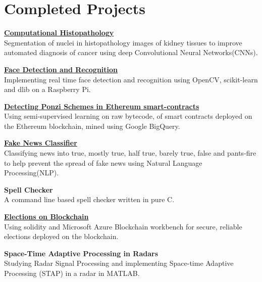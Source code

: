 \documentclass[letterpaper]{article}
\renewenvironment{itemize}{
  \begin{list}{}{
    \setlength{\leftmargin}{1.5em}
  }
}{
  \end{list}
}
\begin{document}
\section*{Completed Projects}
  \begin{itemize}
    \item
    \href{https://github.com/rshwndsz/nuclei-segmentation}{\textbf{Computational Histopathology}}\\
    Segmentation of nuclei in histopathology images of kidney tissues to improve automated diagnosis of cancer using deep Convolutional Neural Networks(CNNs).

    \item
    \href{https://github.com/rshwndsz/face-net}{\textbf{Face Detection and Recognition}}\\
    Implementing real time face detection and recognition using OpenCV, scikit-learn and dlib on a Raspberry Pi.

    \item
    \href{https://github.com/rshwndsz/ponzi-detector}{\textbf{Detecting Ponzi Schemes in Ethereum smart-contracts}}\\
    Using semi-supervised learning on raw bytecode, of smart contracts deployed on the Ethereum blockchain, mined using Google BigQuery.

    \item
    \href{https://github.com/rshwndsz/fake-news-classifier}{\textbf{Fake News Classifier}}\\
    Classifying news into true, mostly true, half true, barely true, false and pants-fire to help prevent the spread of fake news using Natural Language Processing(NLP).

    \item
    \textbf{Spell Checker}\\
    A command line based spell checker written in pure C.

    \item
    \href{https://github.com/rshwndsz/blockchain-elections}{\textbf{Elections on Blockchain}}\\
    Using solidity and Microsoft Azure Blockchain workbench for secure, reliable elections deployed on the blockchain.
  
    \item 
    \textbf{Space-Time Adaptive Processing in Radars}\\
    Studying Radar Signal Processing and implementing Space-time Adaptive Processing (STAP) in a radar in MATLAB.
  \end{itemize}
\end{document}
